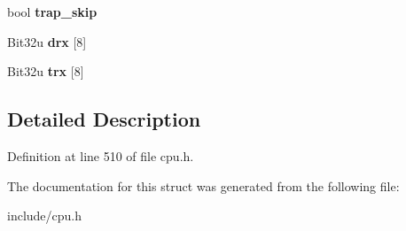 \begin{DoxyCompactItemize}
\item 
\hypertarget{structCPUBlock_ad260beedb05a65ac8494b9d8f38010c2}{bool {\bfseries trap\-\_\-skip}}\label{structCPUBlock_ad260beedb05a65ac8494b9d8f38010c2}

\item 
\hypertarget{structCPUBlock_a58abd61bc639fbb9992d8715bb3ed6ac}{Bit32u {\bfseries drx} \mbox{[}8\mbox{]}}\label{structCPUBlock_a58abd61bc639fbb9992d8715bb3ed6ac}

\item 
\hypertarget{structCPUBlock_a8dacafb431cbcd0b7632b92f1999244a}{Bit32u {\bfseries trx} \mbox{[}8\mbox{]}}\label{structCPUBlock_a8dacafb431cbcd0b7632b92f1999244a}

\end{DoxyCompactItemize}


\subsection{Detailed Description}


Definition at line 510 of file cpu.\-h.



The documentation for this struct was generated from the following file\-:\begin{DoxyCompactItemize}
\item 
include/cpu.\-h\end{DoxyCompactItemize}
